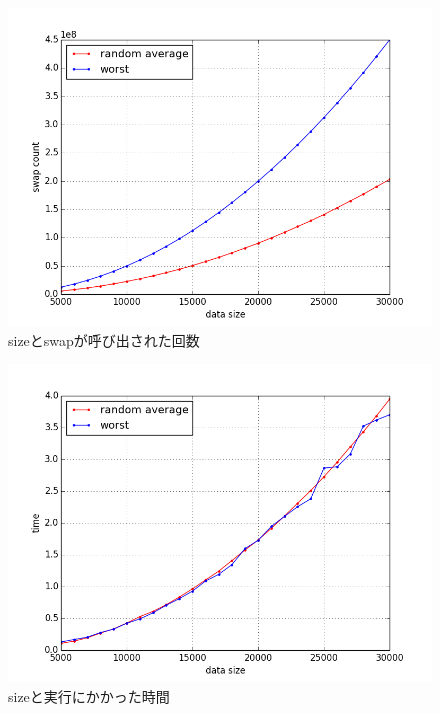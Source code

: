 \documentclass[a4paper]{jsarticle}
\begin{document}
\begin{itemize}
		\begin{figure}[H]
			\centering
			\includegraphics[width=13cm]{./fig1.png}
			\caption{sizeとswapが呼び出された回数}
			\label{fig:1}
		\end{figure}
		\begin{figure}[H]
			\centering
			\includegraphics[width=13cm]{./fig2.png}
			\caption{sizeと実行にかかった時間}
			\label{fig:2}
		\end{figure}
		
	\end{itemize}
\end{document}
